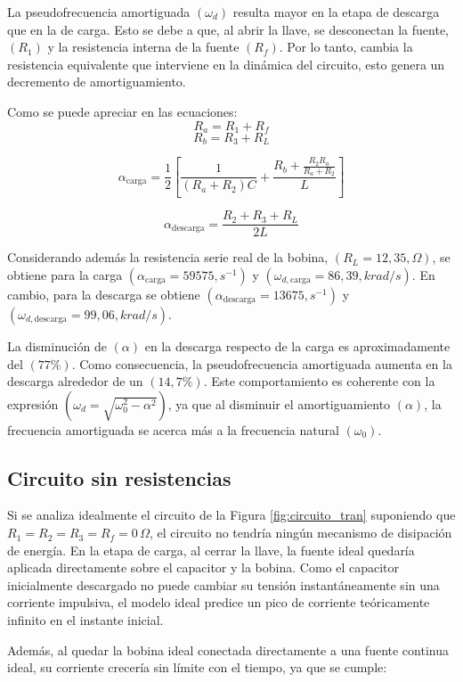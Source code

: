 La pseudofrecuencia amortiguada $(\omega_d)$ resulta mayor en la etapa de descarga que en la de carga. Esto se debe a que, al abrir la llave, se desconectan la fuente, $(R_1)$ y la resistencia interna de la fuente $(R_f)$. Por lo tanto, cambia la resistencia equivalente que interviene en la dinámica del circuito, esto genera un decremento de amortiguamiento.

Como se puede apreciar en las ecuaciones: 
\[
R_a = R_1 + R_f
\]
\[
R_b = R_3 + R_L
\]

\[
\alpha_\text{carga}
=
\frac{1}{2}
\left[
\frac{1}{(R_a+R_2)C}
+
\frac{R_b+\frac{R_2R_a}{R_a+R_2}}{L}
\right]
\]

\[
\alpha_\text{descarga}
=
\frac{R_2+R_3+R_L}{2L}
\]

Considerando además la resistencia serie real de la bobina, $(R_L=12{,}35,\Omega)$, se obtiene para la carga $(\alpha_\text{carga}=59575,s^{-1})$ y $(\omega_{d,\text{carga}}=86{,}39,krad/s)$. En cambio, para la descarga se obtiene $(\alpha_\text{descarga}=13675,s^{-1})$ y $(\omega_{d,\text{descarga}}=99{,}06,krad/s)$.

La disminución de $(\alpha)$ en la descarga respecto de la carga es aproximadamente del $(77\%)$. Como consecuencia, la pseudofrecuencia amortiguada aumenta en la descarga alrededor de un $(14{,}7\%)$. Este comportamiento es coherente con la expresión $(\omega_d=\sqrt{\omega_0^2-\alpha^2})$, ya que al disminuir el amortiguamiento $(\alpha)$, la frecuencia amortiguada se acerca más a la frecuencia natural $(\omega_0)$.



\subsection{Circuito sin resistencias}

Si se analiza idealmente el circuito de la Figura \ref{fig:circuito_tran} suponiendo que $R_1=R_2=R_3=R_f=0\,\Omega$, el circuito no tendría ningún mecanismo de disipación de energía. En la etapa de carga, al cerrar la llave, la fuente ideal quedaría aplicada directamente sobre el capacitor y la bobina. Como el capacitor inicialmente descargado no puede cambiar su tensión instantáneamente sin una corriente impulsiva, el modelo ideal predice un pico de corriente teóricamente infinito en el instante inicial.

Además, al quedar la bobina ideal conectada directamente a una fuente continua ideal, su corriente crecería sin límite con el tiempo, ya que se cumple:

